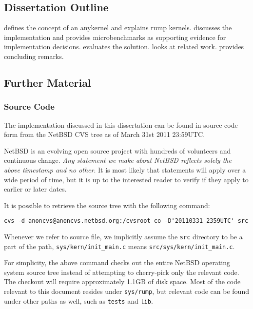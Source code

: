\subsection{Dissertation Outline}

 defines the concept of an anykernel and explains
rump kernels.
 discusses the implementation and provides
microbenchmarks as supporting evidence for implementation decisions.
 evaluates the solution.
 looks at related work.
 provides concluding remarks.

\subsection{Further Material}

\subsubsection{Source Code}
\label{sect:src}

The implementation discussed in this dissertation can be found in
source code form from the NetBSD CVS tree as of March 31st 2011
23:59UTC.

NetBSD is an evolving open source project with hundreds of volunteers
and continuous change.  \textit{Any statement we make about NetBSD
reflects solely the above timestamp and no other}.  It is most
likely that statements will apply over a wide period of time, but
it is up to the interested reader to verify if they apply to earlier
or later dates.

It is possible to retrieve the source tree with the following command:
{\small
\begin{verbatim}
cvs -d anoncvs@anoncvs.netbsd.org:/cvsroot co -D'20110331 2359UTC' src
\end{verbatim}}

Whenever we refer to source file, we implicitly assume
the \texttt{src} directory to be a part of the path, \ie
\verb+sys/kern/init_main.c+ means \verb+src/sys/kern/init_main.c+.

For simplicity, the above command checks out the entire NetBSD
operating system source tree instead of attempting to cherry-pick only
the relevant code.  The checkout will require approximately 1.1GB of
disk space.  Most of the code relevant to this document resides under
\texttt{sys/rump}, but relevant code can be found under other paths as
well, such as \texttt{tests} and \texttt{lib}.

